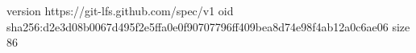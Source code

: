version https://git-lfs.github.com/spec/v1
oid sha256:d2e3d08b0067d495f2e5ffa0e0f90707796ff409bea8d74e98f4ab12a0c6ae06
size 86
